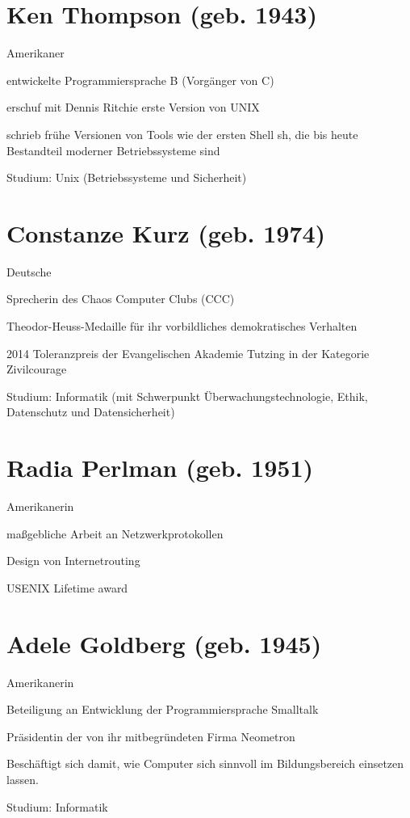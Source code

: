 \documentclass[a4paper,12pt]{report}
\begin{document}
\section*{Ken Thompson (geb. 1943)}
\begin{itemize*}
    \item Amerikaner
    \item entwickelte Programmiersprache B (Vorgänger von C)
    \item erschuf mit Dennis Ritchie erste Version von UNIX
    \item schrieb frühe Versionen von Tools wie der ersten Shell sh, die bis heute Bestandteil
          moderner Betriebssysteme sind
    \item Studium: Unix (Betriebssysteme und Sicherheit)
\end{itemize*}

\section*{Constanze Kurz (geb. 1974)}
\begin{itemize*}
    \item Deutsche 
    \item Sprecherin des Chaos Computer Clubs (CCC)
    \item Theodor-Heuss-Medaille für ihr vorbildliches demokratisches Verhalten
    \item 2014 Toleranzpreis der Evangelischen Akademie Tutzing in der Kategorie Zivilcourage
    \item Studium: Informatik (mit Schwerpunkt Überwachungstechnologie, Ethik, Datenschutz und Datensicherheit)
\end{itemize*}

\section*{Radia Perlman (geb. 1951)}
\begin{itemize*}
    \item Amerikanerin
    \item maßgebliche Arbeit an Netzwerkprotokollen
    \item Design von Internetrouting
    \item USENIX Lifetime award 
\end{itemize*}

\section*{Adele Goldberg (geb. 1945)}
\begin{itemize*}
    \item Amerikanerin
    \item Beteiligung an Entwicklung der Programmiersprache Smalltalk
    \item Präsidentin der von ihr mitbegründeten Firma Neometron
    \item Beschäftigt sich damit, wie Computer sich sinnvoll im Bildungsbereich einsetzen lassen.
    \item Studium: Informatik
\end{itemize*}
\end{document}
